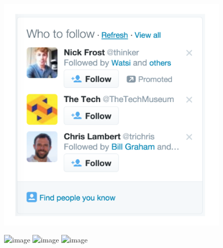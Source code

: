 \documentclass[aspectratio=169]{beamer}
\begin{document}
\begin{frame}

\begin{figure}
\centering
\includegraphics[height = \textheight]{figures/su_effect_2016_fig1}
\end{figure}

\end{frame}
\begin{frame}

\begin{figure}
\centering
\includegraphics<1>[width = 0.3\textwidth]{figures/friend-of-friend-twitter_1}
\includegraphics<2>[width = 0.6\textwidth]{figures/friend-of-friend-twitter_2}
\includegraphics<3>[width = 0.6\textwidth]{figures/friend-of-friend-twitter_3}
\end{figure}



\end{frame}
\end{document}
